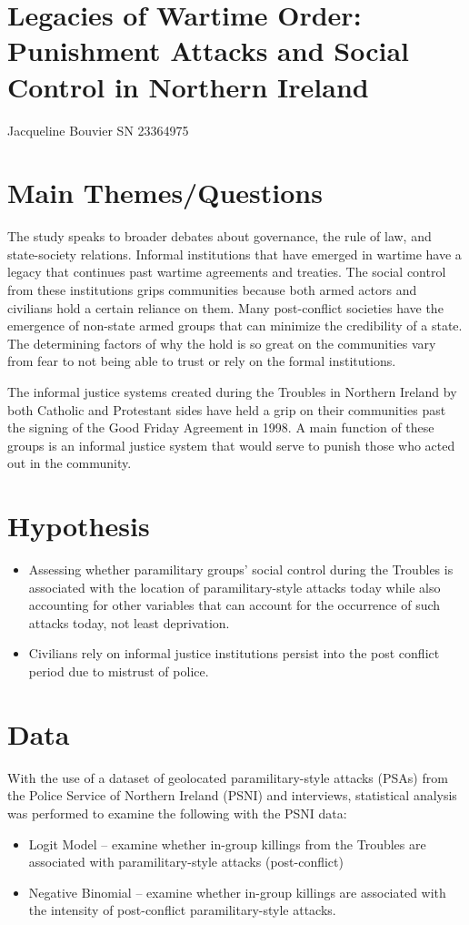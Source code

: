 \documentclass[12pt,letterpaper]{article}
\begin{document}
\maketitle
	\section*{Legacies of Wartime Order: Punishment Attacks and Social Control in Northern Ireland}
	Jacqueline Bouvier SN 23364975
\section*{Main Themes/Questions}
The study speaks to broader debates about governance, the rule of law, and state-society relations. Informal institutions that have emerged in wartime have a legacy that continues past wartime agreements and treaties. The social control from these institutions grips communities because both armed actors and civilians hold a certain reliance on them. Many post-conflict societies have the emergence of non-state armed groups that can minimize the credibility of a state. The determining factors of why the hold is so great on the communities vary from fear to not being able to trust or rely on the formal institutions.

The informal justice systems created during the Troubles in Northern Ireland by both Catholic and Protestant sides have held a grip on their communities past the signing of the Good Friday Agreement in 1998. A main function of these groups is an informal justice system that would serve to punish those who acted out in the community.
\section*{Hypothesis}
\begin{itemize}
\item Assessing whether paramilitary groups’ social control during the Troubles is associated with the location of paramilitary-style attacks today while also accounting for other variables that can account for the occurrence of such attacks today, not least deprivation.
\item Civilians rely on informal justice institutions persist into the post conflict period due to mistrust of police.
\end{itemize}
\section*{Data}
With the use of a dataset of geolocated paramilitary-style attacks (PSAs) from the Police Service of Northern Ireland (PSNI) and interviews, statistical analysis was performed to examine the following with the PSNI data:
\begin{itemize}
	\item Logit Model – examine whether in-group killings from the Troubles are associated with paramilitary-style attacks (post-conflict)
	\item Negative Binomial – examine whether in-group killings are associated with the intensity of post-conflict paramilitary-style attacks.
\end{itemize}
\end{document}
